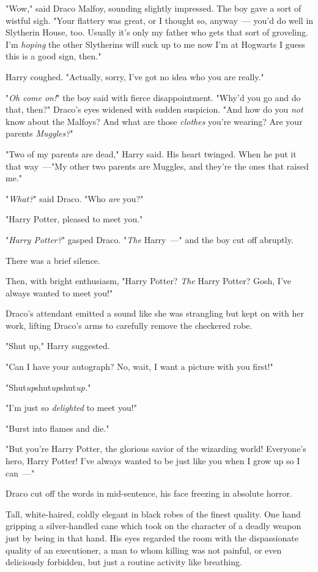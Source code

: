 "Wow," said Draco Malfoy, sounding slightly impressed. The boy gave a sort of
wistful sigh. "Your flattery was great, or I thought so, anyway~--- you'd do well
in Slytherin House, too. Usually it's only my father who gets that sort of
groveling. I'm \emph{hoping} the other Slytherins will suck up to me now I'm
at Hogwarts{\el} I guess this is a good sign, then."

Harry coughed. "Actually, sorry, I've got no idea who you are really."

"\emph{Oh come on!}" the boy said with fierce disappointment. "Why'd you go and
do that, then?" Draco's eyes widened with sudden suspicion. "And how do you
\emph{not} know about the Malfoys? And what are those \emph{clothes} you're
wearing? Are your parents \emph{Muggles?}"

"Two of my parents are dead," Harry said. His heart twinged. When he put it
that way~---"My other two parents are Muggles, and they're the ones that raised
me."

"\emph{What?}" said Draco. "Who \emph{are} you?"

"Harry Potter, pleased to meet you."

"\emph{Harry Potter?}" gasped Draco. "\emph{The} Harry~---" and the boy cut off
abruptly.

There was a brief silence.

Then, with bright enthusiasm, "Harry Potter? \emph{The} Harry Potter? Gosh,
I've always wanted to meet you!"

Draco's attendant emitted a sound like she was strangling but kept on with her
work, lifting Draco's arms to carefully remove the checkered robe.

"Shut up," Harry suggested.

"Can I have your autograph? No, wait, I want a picture with you first!"

"Shut\emph{up}shut\emph{up}shut\emph{up.}"

"I'm just so \emph{delighted} to meet you!"

"Burst into flames and die."

"But you're Harry Potter, the glorious savior of the wizarding world!
Everyone's hero, Harry Potter! I've always wanted to be just like you when I
grow up so I can~---"

Draco cut off the words in mid-sentence, his face freezing in absolute horror.

Tall, white-haired, coldly elegant in black robes of the finest quality. One
hand gripping a silver-handled cane which took on the character of a deadly
weapon just by being in that hand. His eyes regarded the room with the
dispassionate quality of an executioner, a man to whom killing was not painful,
or even deliciously forbidden, but just a routine activity like breathing.

